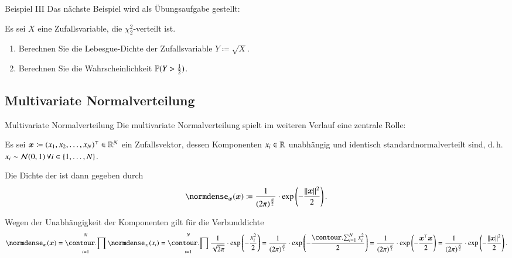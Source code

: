 \begin{frame}{Beispiel III}{}
	Das nächste Beispiel wird als Übungsaufgabe gestellt:
	\begin{mytask}
		Es sei $X$ eine Zufallsvariable, die $\chi_2^2$-verteilt ist.

		\begin{enumerate}
			\item Berechnen Sie die Lebesgue-Dichte der Zufallsvariable $Y \coloneqq \sqrt{X}$.
			\item Berechnen Sie die Wahrscheinlichkeit $\mathbb{P}(Y > \frac{1}{2})$.
		\end{enumerate}
	\end{mytask}
\end{frame}


\subsection{Multivariate Normalverteilung}

\begin{frame}{Multivariate Normalverteilung}{}
	Die multivariate Normalverteilung spielt im weiteren Verlauf eine zentrale Rolle:
	\begin{mytheo}
		Es sei $\bm{x} \coloneqq (x_1, x_2, \ldots, x_N)^\top \in \mathbb{R}^N$ ein Zufallsvektor, dessen Komponenten
		$x_i \in \mathbb{R}$ unabhängig und identisch standardnormalverteilt sind,
		d.\,h. $x_i \sim \mathcal{N}(0, 1)\,\forall i \in \{ 1, \ldots, N \}$.
		
		Die Dichte der  ist dann gegeben durch
		\begin{equation*}
			\normdense_{\bx}(\bx) \coloneqq \frac{1}{(2 \pi)^{\frac{N}{2}}} \cdot \exp\left( -\frac{\Vert \bx \Vert^2}{2} \right).
		\end{equation*}
	\end{mytheo}

	\begin{myproof}
		Wegen der Unabhängigkeit der Komponenten gilt für die Verbunddichte
		\begin{equation*}
			\normdense_{\bx}(\bx)
				= \prod_{i=1}^N \normdense_{x_i}(x_i)
				= \prod_{i=1}^N \frac{1}{\sqrt{2 \pi}} \cdot \exp\left( -\frac{x_i^2}{2} \right)
				= \frac{1}{(2 \pi)^{\frac{N}{2}}} \cdot \exp\left( -\frac{\sum_{i=1}^N x_i^2}{2} \right)
				= \frac{1}{(2 \pi)^{\frac{N}{2}}} \cdot \exp\left( -\frac{\bx^\top \bx}{2} \right)
				= \frac{1}{(2 \pi)^{\frac{N}{2}}} \cdot \exp\left( -\frac{\Vert \bx \Vert^2}{2} \right).
		\end{equation*}
	\end{myproof}
\end{frame}


